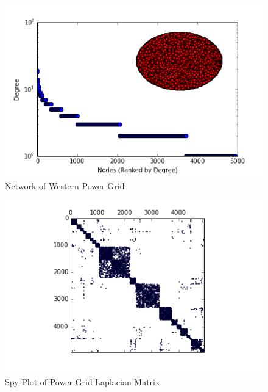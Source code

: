 \documentclass{article}
\begin{document}
\begin{figure}
\centering

\includegraphics[width=\linewidth]{power_degree_histogram.png}
\caption{Network of Western Power Grid \cite{Watts:1998}}
  
\end{figure}

\begin{figure}
\centering
\includegraphics[width = \linewidth]{powerspy.png}
\caption{Spy Plot of Power Grid Laplacian Matrix}
\end{figure}
\end{document}

